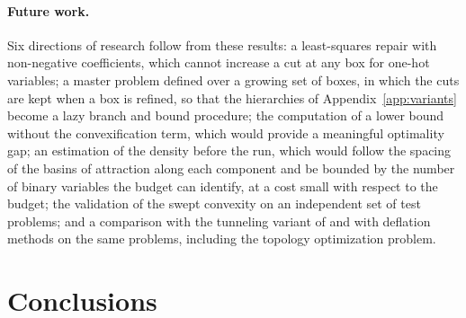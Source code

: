 \documentclass[pdflatex,sn-basic]{sn-jnl}
\begin{document}
\paragraph{Future work.} Six directions of research follow from these results:
a least-squares repair with non-negative coefficients, which cannot increase a
cut at any box for one-hot variables;
a master problem defined over a growing set of boxes, in which the cuts are kept
when a box is refined, so that the hierarchies of Appendix~\ref{app:variants}
become a lazy branch and bound
procedure; the computation of a lower bound without the convexification term,
which would provide a meaningful optimality gap; an estimation of the density
before the run, which would follow the spacing of the basins of attraction
along each component and be bounded by the number of binary variables the
budget can identify, at a cost small with respect to the budget; the
validation of the
swept convexity on an independent set of test problems; and a comparison with
the tunneling variant of \citet{zhang2018tunneling} and with deflation methods on
the same problems, including the topology optimization problem.

\section{Conclusions}\label{sec:conclusion}
\end{document}
